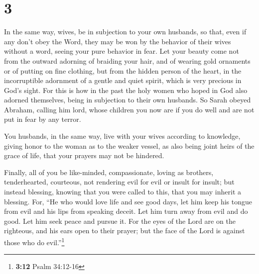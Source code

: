 \hypertarget{section-2}{%
\section{3}\label{section-2}}

 In the same way, wives, be in subjection to your own
husbands, so that, even if any don't obey the Word, they may be won by
the behavior of their wives without a word,  seeing your
pure behavior in fear.  Let your beauty come not from the
outward adorning of braiding your hair, and of wearing gold ornaments or
of putting on fine clothing,  but from the hidden person
of the heart, in the incorruptible adornment of a gentle and quiet
spirit, which is very precious in God's sight.  For this
is how in the past the holy women who hoped in God also adorned
themselves, being in subjection to their own husbands.  So
Sarah obeyed Abraham, calling him lord, whose children you now are if
you do well and are not put in fear by any terror.

 You husbands, in the same way, live with your wives
according to knowledge, giving honor to the woman as to the weaker
vessel, as also being joint heirs of the grace of life, that your
prayers may not be hindered.

 Finally, all of you be like-minded, compassionate, loving
as brothers, tenderhearted, courteous,  not rendering evil
for evil or insult for insult; but instead blessing, knowing that you
were called to this, that you may inherit a blessing. 
For, ``He who would love life and see good days, let him keep his tongue
from evil and his lips from speaking deceit.  Let him
turn away from evil and do good. Let him seek peace and pursue it.
 For the eyes of the Lord are on the righteous, and his
ears open to their prayer; but the face of the Lord is against those who
do evil.''\footnote{\textbf{3:12} Psalm 34:12-16}

